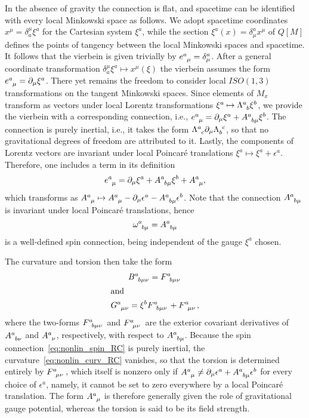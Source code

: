 \documentclass[%
aps,
prd,
reprint
]{revtex4-1}
\newcommand{\ind}{\indices}
\def\pd{\partial}
\begin{document}
In the absence of gravity the connection is flat, and spacetime 
can be identified with every local Minkowski space as follows. We 
adopt spacetime coordinates $x^\mu = \delta^\mu_a \xi^a$ for the 
Cartesian system $\xi^a$, while the section $\xi^a(x) 
= \delta^a_\mu x^\mu$ of $Q[M]$ defines the points of tangency 
between the local Minkowski spaces and spacetime. It follows that 
the vierbein is given trivially by $e\ind{^a_\mu} 
= \delta^a_\mu$. After a general coordinate transformation 
$\delta^\mu_a \xi^a \mapsto x^\mu(\xi)$ the vierbein assumes the 
form $e\ind{^a_\mu} = \pd_\mu \xi^a$. There yet remains the 
freedom to consider local $ISO(1,3)$ transformations on the 
tangent Minkowski spaces. Since elements of $M_x$ transform as 
vectors under local Lorentz transformations $\xi^a \mapsto 
\Lambda\ind{^a_b} \xi^b$, we provide the vierbein with 
a corresponding connection, i.e., $e\ind{^a_\mu} = \pd_\mu\xi^a 
+ A\ind{^a_{b\mu}}\xi^b$. The connection is purely inertial, 
i.e., it takes the form $\Lambda\ind{^a_c} \pd_\mu 
\Lambda\ind{_b^c}$, so that no gravitational degrees of freedom 
are attributed to it.  Lastly, the components of Lorentz vectors 
are invariant under local Poincar\'e translations $\xi^a \mapsto 
\xi^a + \epsilon^a$.  Therefore, one includes a term in its 
definition
\begin{equation}
\label{eq:nonlin_vier_RC}
  e\ind{^a_\mu} = \pd_\mu\xi^a + A\ind{^a_{b\mu}}\xi^b 
  + A\ind{^a_\mu},
\end{equation}
which transforms as $A\ind{^a_\mu} \mapsto A\ind{^a_\mu} 
- \pd_\mu \epsilon^a - A\ind{^a_{b\mu}} \epsilon^b$. Note that 
the connection $A\ind{^a_{b\mu}}$ is invariant under local 
Poincar\'e translations, hence
\begin{equation}
\label{eq:nonlin_spin_RC}
  \omega\ind{^a_{b\mu}} = A\ind{^a_{b\mu}}
\end{equation}
is a well-defined spin connection, being independent of the gauge 
$\xi^a$ chosen.

The curvature and torsion then take the form
\begin{gather}
\label{eq:nonlin_curv_RC}
  B\ind{^a_{b\mu\nu}} = F\ind{^a_{b\mu\nu}}
  \\
  \shortintertext{and}
  \label{eq:nonlin_tors_RC}
  G\ind{^a_{\mu\nu}} = \xi^b F\ind{^a_{b\mu\nu}} 
  + F\ind{^a_{\mu\nu}},
\end{gather}
where the two-forms $F\ind{^a_{b\mu\nu}}$ and 
$F\ind{^a_{\mu\nu}}$ are the exterior covariant derivatives of 
$A\ind{^a_{b\nu}}$ and $A\ind{^a_\nu}$, respectively, with 
respect to $A\ind{^a_{b\mu}}$. Because the spin 
connection~\eqref{eq:nonlin_spin_RC} is purely inertial, the 
curvature~\eqref{eq:nonlin_curv_RC} vanishes, so that the torsion 
is determined entirely by $F\ind{^a_{\mu\nu}}$, which itself is 
nonzero only if $A\ind{^a_\mu} \neq \pd_\mu \epsilon^a 
+ A\ind{^a_{b\mu}} \epsilon^b$ for every choice of $\epsilon^a$, 
namely, it cannot be set to zero everywhere by a local Poincar\'e 
translation. The form $A\ind{^a_\mu}$ is therefore generally 
given the role of gravitational gauge potential, whereas the 
torsion is said to be its field strength.
\end{document}

